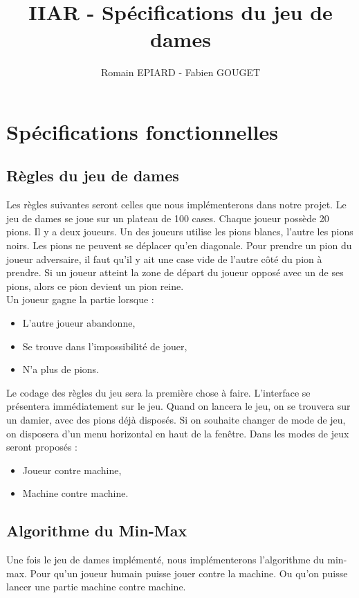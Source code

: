 \documentclass[a4paper, title page, 12pt]{report}
\title{IIAR - Spécifications du jeu de dames}
\author{Romain EPIARD - Fabien GOUGET}
\date{}
\begin{document}
		
		
	\setcounter{page}{1}
	\newpage

	\tableofcontents
	\newpage	
	\chapter{Spécifications fonctionnelles}
	\section{Règles du jeu de dames}
	Les règles suivantes seront celles que nous implémenterons dans notre projet. Le jeu de dames se joue sur un plateau de 100 cases. Chaque joueur possède 20 pions. Il y a deux joueurs. Un des joueurs utilise les pions blancs, l'autre les pions noirs. Les pions ne peuvent se déplacer qu'en diagonale. Pour prendre un pion du joueur adversaire, il faut qu'il y ait une case vide de l'autre côté du pion à prendre. Si un joueur atteint la zone de départ du joueur opposé avec un de ses pions, alors ce pion devient un pion reine.\\

Un joueur gagne la partie lorsque :
\begin{itemize}
	\item L'autre joueur abandonne,
	\item Se trouve dans l'impossibilité de jouer,
	\item N'a plus de pions.\\
\end{itemize}

Le codage des règles du jeu sera la première chose à faire. L'interface se présentera immédiatement sur le jeu. Quand on lancera le jeu, on se trouvera sur un damier, avec des pions déjà disposés. Si on souhaite changer de mode de jeu, on disposera d'un menu horizontal en haut de la fenêtre. Dans les modes de jeux seront proposés : 

\begin{itemize}
	\item Joueur contre machine,
	\item Machine contre machine.
\end{itemize}

	\newpage
		
	\section{Algorithme du Min-Max}
	Une fois le jeu de dames implémenté, nous implémenterons l'algorithme du min-max. Pour qu'un joueur humain puisse jouer contre la machine. Ou qu'on puisse lancer une partie machine contre machine.\\
	
\end{document}

